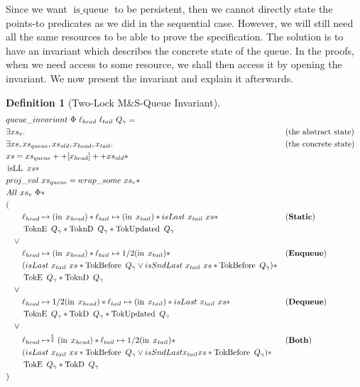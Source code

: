 \documentclass[twoside,11pt,openright]{report}
\newtheorem{definition}{Definition}[section]
\newcommand{\isqueue}{\operatorname{is\_queue}}
\newcommand{\isLL}{\operatorname{isLL}}
\newcommand{\nIn}[1]{\operatorname{in} \; #1}
\newcommand{\StaticState}{\textbf{Static}}
\newcommand{\EnqueueState}{\textbf{Enqueue}}
\newcommand{\DequeueState}{\textbf{Dequeue}}
\newcommand{\BothState}{\textbf{Both}}
\newcommand{\Qgnames}{Q_\gname}
\newcommand{\TokE}[1]{\operatorname{TokE}\ #1}
\newcommand{\TokEQg}{\TokE{\Qgnames}}
\newcommand{\ToknE}[1]{\operatorname{ToknE}\ #1}
\newcommand{\ToknEQg}{\ToknE{\Qgnames}}
\newcommand{\TokD}[1]{\operatorname{TokD}\ #1}
\newcommand{\TokDQg}{\TokD{\Qgnames}}
\newcommand{\ToknD}[1]{\operatorname{ToknD}\ #1}
\newcommand{\ToknDQg}{\ToknD{\Qgnames}}
\newcommand{\TokBefore}[1]{\operatorname{TokBefore}\ #1}
\newcommand{\TokBeforeQg}{\TokBefore{\Qgnames}}
\newcommand{\TokAfterQg}{\TokBefore{\Qgnames}}
\newcommand{\TokUpdated}[1]{\operatorname{TokUpdated}\ #1}
\newcommand{\TokUpdatedQg}{\TokUpdated{\Qgnames}}
\begin{document}
Since we want $\isqueue$ to be persistent, then we cannot directly state the points-to predicates as we did in the sequential case. However, we will still need all the same resources to be able to prove the specification. The solution is to have an invariant which describes the concrete state of the queue. In the proofs, when we need access to some resource, we shall then access it by opening the invariant. We now present the invariant and explain it afterwards.
\begin{definition}[Two-Lock M\&S-Queue Invariant]\label{MSQTL:spec:invariant}
  \begin{align*}
    &queue\_invariant \ \Phi \ \loc_{head} \ \loc_{tail} \ Q_\gname =\\
    &\exists xs_v. &&\text{(the abstract state)}\\
    &\exists xs, xs_{queue}, xs_{old}, x_{head}, x_{tail} . &&\text{(the concrete state)}\\
    &xs = xs_{queue} ++ [x_{head}] ++ xs_{old} \ast\\
    &\isLL \ xs \ast\\
    &proj\_val \ xs_{queue} = wrap\_some \ xs_v \ast\\
    &All \ xs_v \ \Phi \ast\\
    &(\\
    &\quad\quad\loc_{head} \mapsto (\nIn{x_{head}}) \ast \loc_{tail} \mapsto (\nIn{x_{tail}}) \ast isLast \ x_{tail} \ xs \ast &&\text{(\StaticState)}\\
    &\quad\quad \ToknEQg \ast \ToknDQg \ast \TokUpdatedQg\\
    &\quad\lor\\
    &\quad\quad\loc_{head} \mapsto (\nIn{x_{head}}) \ast \loc_{tail} \mapsto{1/2} (\nIn{x_{tail}}) \ast &&\text{(\EnqueueState)}\\
    &\quad\quad (isLast \ x_{tail} \ xs \ast \TokBeforeQg \lor isSndLast \ x_{tail} \ xs \ast \TokAfterQg) \ast\\
    &\quad\quad \TokEQg \ast \ToknDQg\\
    &\quad\lor\\
    &\quad\quad\loc_{head} \mapsto{1/2} (\nIn{x_{head}}) \ast \loc_{tail} \mapsto (\nIn{x_{tail}}) \ast isLast \ x_{tail} \ xs \ast &&\text{(\DequeueState)}\\
    &\quad\quad \ToknEQg \ast \TokDQg \ast \TokUpdatedQg\\
    &\quad\lor\\
    &\quad\quad\loc_{head} \mapsto^{\frac{1}{2}} (\nIn{x_{head}}) \ast \loc_{tail} \mapsto{1/2} (\nIn{x_{tail}}) \ast &&\text{(\BothState)}\\
    &\quad\quad (isLast \ x_{tail} \ xs \ast \TokBeforeQg \lor isSndLast x_{tail} xs \ast \TokAfterQg) \ast\\
    &\quad\quad \TokEQg \ast \TokDQg\\
    &)
  \end{align*}
\end{definition}
\end{document}
